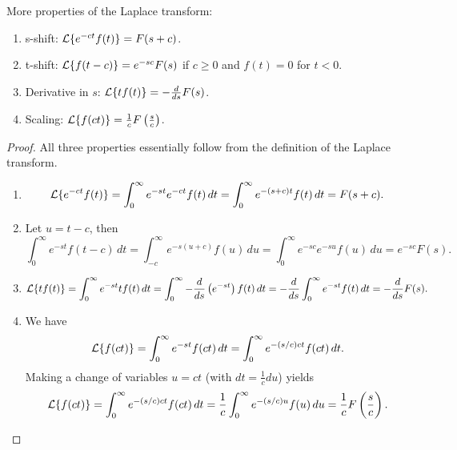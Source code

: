 More properties of the Laplace transform:
\begin{enumerate}
	\item s-shift: $\mathcal{L}\{e^{-ct}f(t)\} = F(s+c)$.
	\item t-shift: $\mathcal{L}\{f(t-c)\} = e^{-sc}F(s)$ if $c \geq 0$ and $f(t)=0$ for $t<0$.
	\item Derivative in $s$: $\mathcal{L}\{tf(t)\} = -\frac{d}{ds}F(s)$.
	\item Scaling: $\mathcal{L}\{f(ct)\} = \frac{1}{c} F\left(\frac{s}{c}\right)$.
\end{enumerate}

\begin{proof}\hfill
	All three properties essentially follow from the definition of the Laplace transform.
	\begin{enumerate}
		\item \[\mathcal{L}\{e^{-ct}f(t)\} = \int_0^{\infty} e^{-st}e^{-ct}f(t) \,dt = \int_0^{\infty} e^{-(s+c)t}f(t) \,dt = F(s+c).\]
		\item Let $u=t-c$, then
		\[
			\int_0^{\infty} e^{-st}f(t-c) \,dt = \int_{-c}^{\infty} e^{-s(u+c)}f(u) \,du = \int_0^{\infty} e^{-sc}e^{-su}f(u) \,du = e^{-sc}F(s).
		\]
		\item \[\mathcal{L}\{tf(t)\} = \int_0^{\infty} e^{-st}tf(t) \,dt = \int_0^{\infty} -\frac{d}{ds}\left(e^{-st}\right) f(t) \,dt = -\frac{d}{ds} \int_0^{\infty} e^{-st}f(t) \,dt = -\frac{d}{ds}F(s).\]
		\item We have
		\[
		\mathcal{L}\{f(ct)\} = \int_0^{\infty} e^{-st}f(ct)\,dt = \int_0^{\infty} e^{-(s/c)ct}f(ct)\,dt.
		\]
		Making a change of variables $u=ct$ (with $dt = \frac{1}{c}du$) yields
		\[
		\mathcal{L}\{f(ct)\} = \int_0^{\infty} e^{-(s/c)ct}f(ct)\,dt = \frac{1}{c} \int_0^{\infty} e^{-(s/c)u}f(u)\,du = \frac{1}{c} F\left(\frac{s}{c}\right).
		\]
	\end{enumerate}
\end{proof}

